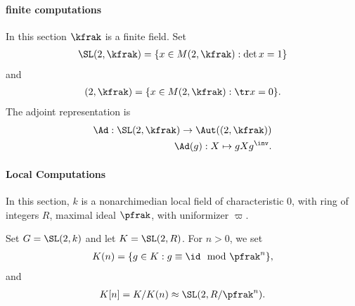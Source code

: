\paragraph{finite computations}
In this section $\kfrak$ is a finite field. Set
\begin{align*}
	\SL(2,\kfrak) = \{ x \in M(2,\kfrak) : \det x =1 \}
\end{align*}
and
\begin{align*}
	\sl(2,\kfrak) = \{ x \in M(2,\kfrak) : \tr x = 0 \}.
\end{align*}
The adjoint representation is
\begin{align*}
	\Ad : \SL(2,\kfrak) \to \Aut(\sl(2,\kfrak)) \\
	\Ad(g):  X \mapsto  g X g^\inv.
\end{align*}

\paragraph{Local Computations}
In this section, $k$ is a nonarchimedian local field of characteristic $0$, with ring of integers $R$, maximal ideal $\pfrak$, with uniformizer $\varpi$.

Set $G = \SL(2,k)$ and let $K = \SL(2,R)$. For $n>0$, we set
\begin{align*}
	K(n) = \{ g \in K : g \equiv \id \mod \pfrak^n\},
\end{align*}
and
\begin{align*}
	K[n] = K/K(n) \approx \SL(2,R/\pfrak^n).
\end{align*}
\cite{leiningerLengthEigenvalueEquivalence2007}
\cite{voightQuaternionAlgebras2021}
